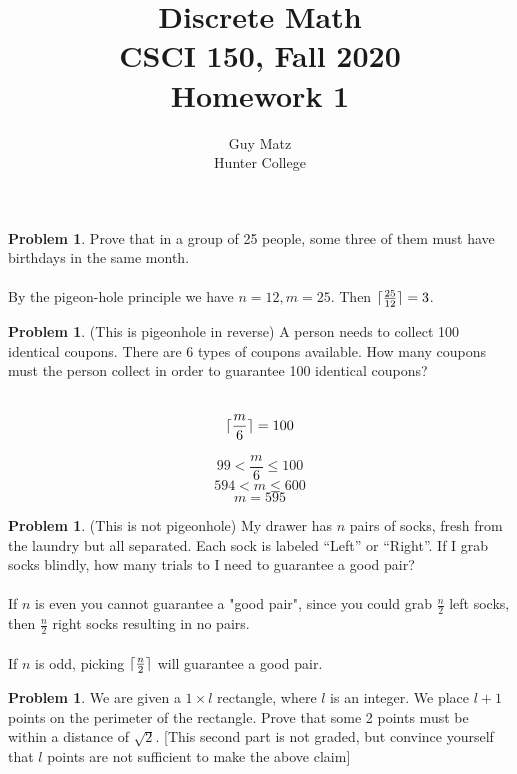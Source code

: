 \documentclass[10pt,leqno ]{article}
\title{Discrete Math\\
CSCI 150, Fall 2020\\
Homework 1}
\author{Guy Matz \\
Hunter College}
\theoremstyle{definition}
\newtheorem{problem}[theorem]{Problem}
\DeclarePairedDelimiter{\ceil}{\lceil}{\rceil}
\begin{document}
\begin{problem} Prove that in a group of 25 people, some three of them must have birthdays in the same month.
\\\\
\Large
By the pigeon-hole principle we have $n=12, m = 25$.  Then $\ceil{\frac{25}{12}}= 3$.
\end{problem}
\newpage

\begin{problem} (This  is  pigeonhole  in  reverse)  A  person  needs  to  collect  100  identical coupons.   There  are  6  types  of  coupons  available.   How  many  coupons must the person collect in order to guarantee 100 identical coupons?
\\\\
\Large

$$\ceil{\frac{m}{6}} = 100$$

$$99 < \frac{m}{6} \leq 100$$
$$594 < m \leq 600$$
$$m = 595$$

\end{problem}
\newpage

\begin{problem}  (This is not pigeonhole) My drawer has $n$ pairs of socks, fresh from the laundry but all separated.  Each sock is labeled “Left” or “Right”.  If I grab socks blindly, how many trials to I need to guarantee a good pair?
\\\\
\Large
If $n$ is even you cannot guarantee a "good pair", since you could grab $\frac{n}{2}$ left socks, then $\frac{n}{2}$ right socks resulting in no pairs.
\\\\
If $n$ is odd, picking $\ceil{\frac{n}{2}}$ will guarantee a good pair.
\end{problem}
\newpage

\begin{problem} We  are  given  a  $1 \times l$ rectangle,  where $l$ is  an  integer.   We  place $l+ 1$ points on the perimeter of the rectangle.  Prove that some 2 points must be within a distance of $\sqrt{2}$.  [This second part is not graded, but convince yourself that $l$ points are not sufficient to make the above claim]
\\\\
\Large
\end{problem}
\newpage
\end{document}

